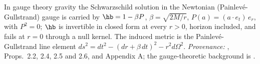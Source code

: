 In gauge theory gravity the Schwarzschild solution in the Newtonian (Painlev\'e-Gullstrand) gauge is carried by $\hb = 1 - \beta P$, $\beta = \sqrt{2M/r}$, $P(a) = (a \cdot e_t)\,e_r$, with $P^2 = 0$; $\hb$ is invertible in closed form at every $r > 0$, horizon included, and fails at $r = 0$ through a null kernel. The induced metric is the Painlev\'e-Gullstrand line element $ds^2 = dt^2 - (dr + \beta\,dt)^2 - r^2 d\Omega^2$. \emph{Provenance:} \cite{ButlerT5}, Props.~2.2, 2.4, 2.5 and 2.6, and Appendix A; the gauge-theoretic background is \cite{DoranLasenby2003}.
